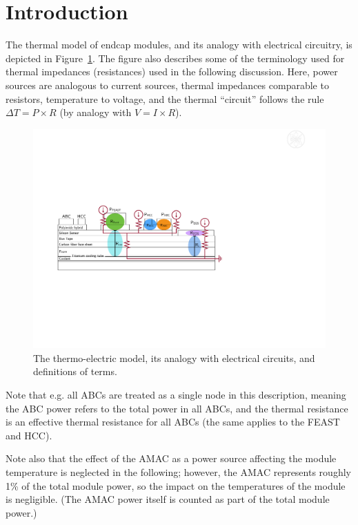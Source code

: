 
\section{Introduction}

The thermal model of endcap modules, and its analogy with electrical circuitry, is depicted in
Figure~\ref{thermoelectric_model}. The figure also describes some of the terminology used for thermal
impedances (resistances) used in the following discussion. Here, power sources are analogous to
current sources, thermal impedances comparable to resistors, temperature to voltage, and the thermal
``circuit'' follows the rule $\Delta T=P\times R$ (by analogy with $V=I\times R$).

\begin{figure}[ht!]
\includegraphics[width=.99\textwidth]{figures/thermoelectric_model.pdf}
\caption{
The thermo-electric model, its analogy with electrical circuits, and definitions of terms.
}
\label{thermoelectric_model}
\end{figure}

Note that e.g. all ABCs are treated as a single node in this description, meaning the ABC power refers
to the total power in all ABCs, and the thermal resistance is an effective thermal resistance for all
ABCs (the same applies to the FEAST and HCC).

Note also that the effect of the AMAC as a power source affecting the module temperature is neglected
in the following; however, the AMAC represents roughly 1\% of the total module power, so the impact on
the temperatures of the module is negligible. (The AMAC power itself is counted as part of the total
module power.)

